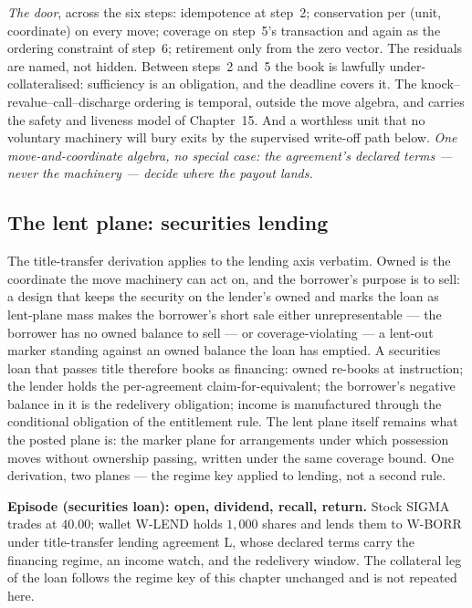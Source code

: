 \emph{The door}, across the six steps: idempotence at step~2; conservation per
(unit, coordinate) on every move; coverage on step~5's transaction and again
as the ordering constraint of step~6; retirement only from the zero vector.
The residuals are named, not hidden. Between steps~2 and~5 the book is
lawfully under-collateralised: sufficiency is an obligation, and the deadline
covers it. The knock--revalue--call--discharge ordering is temporal, outside
the move algebra, and carries the safety and liveness model of Chapter~15.
And a worthless unit that no voluntary machinery will bury exits by the
supervised write-off path below.
\emph{One move-and-coordinate algebra, no special case: the agreement's
declared terms --- never the machinery --- decide where the payout lands.}

\subsection{The lent plane: securities lending}

The title-transfer derivation applies to the lending axis verbatim. Owned is
the coordinate the move machinery can act on, and the borrower's purpose is to
sell: a design that keeps the security on the lender's owned and marks the
loan as lent-plane mass makes the borrower's short sale either unrepresentable
--- the borrower has no owned balance to sell --- or coverage-violating ---
a lent-out marker standing against an owned balance the loan has emptied. A
securities loan that passes title therefore books as financing: owned re-books
at instruction; the lender holds the per-agreement claim-for-equivalent; the
borrower's negative balance in it is the redelivery obligation; income is
manufactured through the conditional obligation of the entitlement rule. The
lent plane itself remains what the posted plane is: the marker plane for
arrangements under which possession moves without ownership passing, written
under the same coverage bound. One derivation, two planes --- the regime key
applied to lending, not a second rule.

\medskip\noindent\textbf{Episode (securities loan): open, dividend, recall,
return.} Stock SIGMA trades at $40.00$; wallet W-LEND holds $1{,}000$ shares
and lends them to W-BORR under title-transfer lending agreement L, whose
declared terms carry the financing regime, an income watch, and the redelivery
window. The collateral leg of the loan follows the regime key of this chapter
unchanged and is not repeated here.


